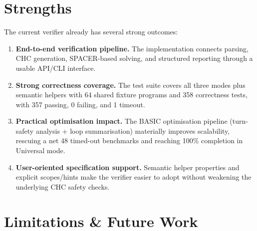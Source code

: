 \section*{Strengths}
The current verifier already has several strong outcomes:
\begin{enumerate}
    \item \textbf{End-to-end verification pipeline.} The implementation connects parsing, CHC generation, SPACER-based solving, and structured reporting through a usable API/CLI interface.
    \item \textbf{Strong correctness coverage.} The test suite covers all three modes plus semantic helpers with 64 shared fixture programs and 358 correctness tests, with 357 passing, 0 failing, and 1 timeout.
    \item \textbf{Practical optimisation impact.} The BASIC optimisation pipeline (turn-safety analysis + loop summarisation) materially improves scalability, rescuing a net 48 timed-out benchmarks and reaching 100\% completion in Universal mode.
    \item \textbf{User-oriented specification support.} Semantic helper properties and explicit scopes/hints make the verifier easier to adopt without weakening the underlying CHC safety checks.
\end{enumerate}

\section*{Limitations \& Future Work}

